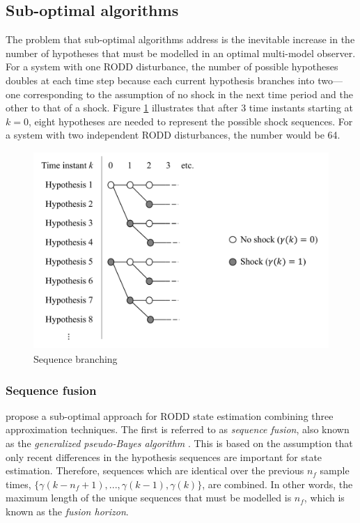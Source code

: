 \subsection{Sub-optimal algorithms}

The problem that sub-optimal algorithms address is the inevitable increase in the number of hypotheses that must be modelled in an optimal multi-model observer. For a system with one RODD disturbance, the number of possible hypotheses doubles at each time step because each current hypothesis branches into two—one corresponding to the assumption of no shock in the next time period and the other to that of a shock. Figure \ref{fig:mm-obs-br} illustrates that after 3 time instants starting at $k=0$, eight hypotheses are needed to represent the possible shock sequences. For a system with two independent RODD disturbances, the number would be 64.

\begin{figure}[htp]
	\centering
	\includegraphics[height=7.5cm]{images/mm_obs_seq_br.pdf}
	\caption{Sequence branching}
	\label{fig:mm-obs-br}
\end{figure}


\subsubsection{Sequence fusion} \label{subsec-fusion}

\cite{robertson_detection_1995} propose a sub-optimal approach for RODD state estimation combining three approximation techniques. The first is referred to as \textit{sequence fusion}, also known as the \textit{generalized pseudo-Bayes algorithm} \citep{buxbaum_recursive_1969, jaffer_estimation_1971, tugnait_detection_1982}. This is based on the assumption that only recent differences in the hypothesis sequences are important for state estimation. Therefore, sequences which are identical over the previous $n_f$ sample times, $\{\gamma(k-n_f+1), ...,  \gamma(k-1), \gamma(k)\}$, are combined. In other words, the maximum length of the unique sequences that must be modelled is $n_f$, which is known as the \textit{fusion horizon}.

